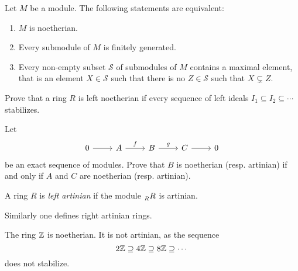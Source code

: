 
\begin{exercise}
    Let $M$ be a module. The following statements are equivalent:
    \begin{enumerate}
        \item $M$ is noetherian.
        \item Every submodule of $M$ is finitely generated. 
        \item Every non-empty subset $\mathcal{S}$ of submodules of $M$ contains a maximal element, that is
            an element $X\in\mathcal{S}$ such that there is no $Z\in\mathcal{S}$ such that $X\subsetneq Z$.  
    \end{enumerate}
\end{exercise}

\begin{exercise}
    Prove that a ring $R$ is left noetherian if every sequence of 
    left ideals $I_1\subseteq I_2\subseteq\cdots$ stabilizes. 
\end{exercise}

\begin{exercise}
\label{xca:AN_exact}
	Let 
	\[
	\begin{tikzcd}
		0 \arrow{r}
		& A \arrow{r}{f}
		& B \arrow{r}{g}
		& C \arrow{r}
		& 0
	\end{tikzcd}
	\]
	be an exact sequence of modules. Prove that $B$ is noetherian (resp.
	artinian) if and only if $A$ and $C$ are noetherian (resp. artinian).
\end{exercise}


\begin{definition}
	A ring $R$ is \emph{left artinian} if the module 
	$\prescript{}{R}R$ is artinian.
\end{definition}

Similarly one defines right artinian rings. 

\begin{example}
	The ring $\mathbb{Z}$ is noetherian. It is not artinian, as the sequence
	\[
	2\mathbb{Z}\supseteq
	4\mathbb{Z}\supseteq 8\mathbb{Z}\supseteq\cdots
	\]
	does not stabilize. 
\end{example}

